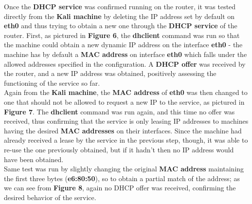 Once the \textbf{DHCP service} was confirmed running on the router, it was tested directly from the \textbf{Kali machine} by deleting the IP address set by default on \textbf{eth0} and thus trying to obtain a new one through the \textbf{DHCP service} of the router. First, as pictured in \textbf{Figure 6}, the \textbf{dhclient} command was run so that the machine could obtain a new dynamic IP address on the interface \textbf{eth0} - the machine has by default a \textbf{MAC address} on interface \textbf{eth0} which falls under the allowed addresses specified in the configuration. A \textbf{DHCP offer} was received by the router, and a new IP address was obtained, positively assessing the functioning of the service so far.\\
Again from the \textbf{Kali machine}, the \textbf{MAC address} of \textbf{eth0} was then changed to one that should not be allowed to request a new IP to the service, as pictured in \textbf{Figure 7}. The \textbf{dhclient} command was run again, and this time no offer was received, thus confirming that the service is only leasing IP addresses to machines having the desired \textbf{MAC addresses} on their interfaces. Since the machine had already received a lease by the service in the previous step, though, it was able to re-use the one previously obtained, but if it hadn't then no IP address would have been obtained.\\
Same test was run by slightly changing the original \textbf{MAC address} maintaining the first three bytes (\textbf{e6:80:50}), so to obtain a partial match of the address; as we can see from \textbf{Figure 8}, again no DHCP offer was received, confirming the desired behavior of the service.

